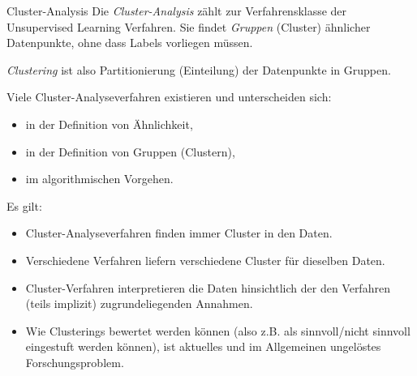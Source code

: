 \begin{defi}{Cluster-Analysis}
    Die \emph{Cluster-Analysis} zählt zur Verfahrensklasse der Unsupervised Learning Verfahren.
    Sie findet \emph{Gruppen} (Cluster) ähnlicher Datenpunkte, ohne dass Labels vorliegen müssen.

    \emph{Clustering} ist also Partitionierung (Einteilung) der Datenpunkte in Gruppen.

    Viele Cluster-Analyseverfahren existieren und unterscheiden sich:
    \begin{itemize}
        \item in der Definition von Ähnlichkeit,
        \item in der Definition von Gruppen (Clustern),
        \item im algorithmischen Vorgehen.
    \end{itemize}

    Es gilt:
    \begin{itemize}
        \item Cluster-Analyseverfahren finden immer Cluster in den Daten.
        \item Verschiedene Verfahren liefern verschiedene Cluster für dieselben Daten.
        \item Cluster-Verfahren interpretieren die Daten hinsichtlich der den Verfahren (teils implizit) zugrundeliegenden Annahmen.
        \item Wie Clusterings bewertet werden können (also z.B. als sinnvoll/nicht sinnvoll eingestuft werden können), ist aktuelles und im Allgemeinen ungelöstes Forschungsproblem.
    \end{itemize}
\end{defi}

